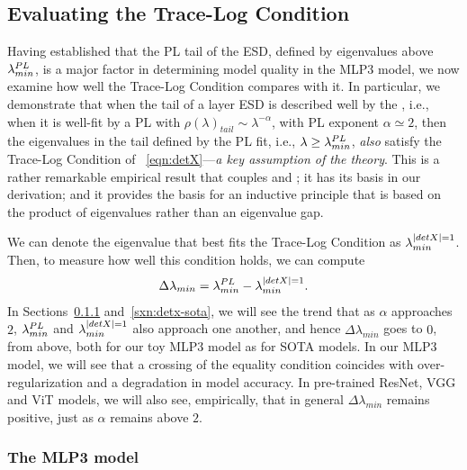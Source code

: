 
\subsection{Evaluating the Trace-Log Condition}
\label{sxn:empirical-trace_log}

Having established that the PL tail of the ESD, defined by eigenvalues above $\lambda^{PL}_{min}$, is a major factor in determining model quality in the MLP3 model, we now examine how well the Trace-Log Condition compares with it. 
In particular, we demonstrate that when the tail of a layer ESD is described well by the \HTSR \Phenomenology, i.e., when 
it is well-fit by a PL with $\rho(\lambda)_{tail}\sim\lambda^{-\alpha}$, with PL exponent $\alpha\simeq2$, then the 
eigenvalues in the tail defined by the PL fit, i.e., $\lambda\ge\lambda^{PL}_{min}$, \emph{also} satisfy the Trace-Log Condition 
of \EQN~\ref{eqn:detX}---\emph{a key assumption of the \SETOL theory}.
This is a rather remarkable empirical result that couples \HTSR and \SETOL; it has its basis in our \SETOL derivation; and it provides the basis for an inductive principle that is based on the product of eigenvalues rather than an eigenvalue gap.

We can denote the eigenvalue that best fits the Trace-Log Condition as $\lambda^{\vert detX\vert=1}_{min}$. 
Then, to measure how well this condition holds, we can compute
\begin{align}
        \label{eqn:D_lambda_min}
        \Delta \lambda_{min} = \lambda^{PL}_{min} - \lambda^{\vert detX\vert=1}_{min}  .
\end{align}
In Sections~\ref{sxn:detx-mlp3} and~\ref{sxn:detx-sota}, we will see the trend that as $\alpha$ approaches $2$, $\lambda^{PL}_{min}$ and $\lambda^{\vert detX\vert=1}_{min}$ also approach one another, and hence $\Delta \lambda_{min}$ goes to $0$, from above, both for our toy MLP3 model as for SOTA models.
In our MLP3 model, we will see that a crossing of the equality condition coincides with over-regularization and a degradation in model accuracy. 
In pre-trained ResNet\cite{ResNet15_TR}, VGG\cite{VGG14_TR} and ViT\cite{VIT20_TR} models, we will also see, empirically, that in general $\Delta \lambda_{min}$ remains positive, just as $\alpha$ remains above $2$.


\subsubsection{The MLP3 model}
\label{sxn:detx-mlp3}

